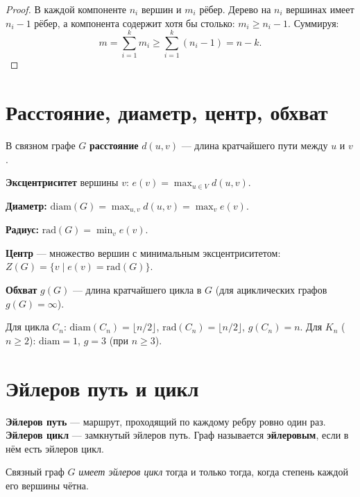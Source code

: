 \documentclass[12pt]{article}
\begin{document}
\begin{proof}
В каждой компоненте $n_i$ вершин и $m_i$ рёбер.
Дерево на $n_i$ вершинах имеет $n_i - 1$ рёбер, а компонента
содержит хотя бы столько: $m_i \geq n_i - 1$.
Суммируя:
\[
m = \sum_{i=1}^k m_i \geq \sum_{i=1}^k (n_i - 1) = n - k.
\]
\end{proof}

\section{Расстояние, диаметр, центр, обхват}

\begin{definition}
В связном графе $G$ \textbf{расстояние} $d(u,v)$ --- длина
кратчайшего пути между $u$ и $v$.

\textbf{Эксцентриситет} вершины $v$: $e(v) = \max_{u \in V} d(u,v)$.

\textbf{Диаметр:} $\mathrm{diam}(G) = \max_{u,v} d(u,v) = \max_v e(v)$.

\textbf{Радиус:} $\mathrm{rad}(G) = \min_v e(v)$.

\textbf{Центр} --- множество вершин с минимальным эксцентриситетом:
$Z(G) = \{v \mid e(v) = \mathrm{rad}(G)\}$.

\textbf{Обхват} $g(G)$ --- длина кратчайшего цикла в $G$
(для ациклических графов $g(G) = \infty$).
\end{definition}

\begin{example}
Для цикла $C_n$: $\mathrm{diam}(C_n) = \lfloor n/2 \rfloor$,
$\mathrm{rad}(C_n) = \lfloor n/2 \rfloor$, $g(C_n) = n$.
Для $K_n$ ($n \geq 2$): $\mathrm{diam} = 1$, $g = 3$ (при $n \geq 3$).
\end{example}

\section{Эйлеров путь и цикл}

\begin{definition}
\textbf{Эйлеров путь} --- маршрут, проходящий по каждому ребру
ровно один раз.
\textbf{Эйлеров цикл} --- замкнутый эйлеров путь.
Граф называется \textbf{эйлеровым}, если в нём есть эйлеров цикл.
\end{definition}

\begin{theorem}[Эйлер, 1736]
Связный граф $G$ \emph{имеет эйлеров цикл} тогда и только тогда,
когда степень каждой его вершины чётна.
\end{theorem}
\end{document}
